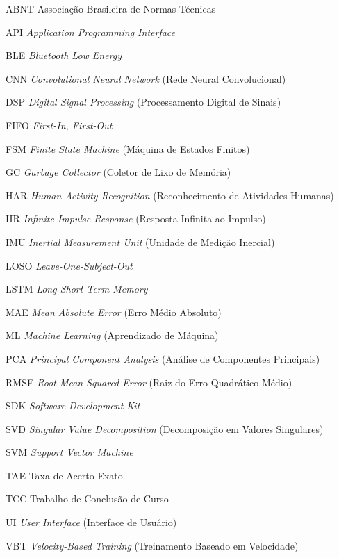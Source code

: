 \documentclass[12pt,openany,oneside,a4paper,english,brazil]{abntex2}
\begin{document}
\begin{siglas}
  \item[ABNT] Associação Brasileira de Normas Técnicas
  \item[API] \textit{Application Programming Interface}
  \item[BLE] \textit{Bluetooth Low Energy}
  \item[CNN] \textit{Convolutional Neural Network} (Rede Neural Convolucional)
  \item[DSP] \textit{Digital Signal Processing} (Processamento Digital de Sinais)
  \item[FIFO] \textit{First-In, First-Out}
  \item[FSM] \textit{Finite State Machine} (Máquina de Estados Finitos)
  \item[GC] \textit{Garbage Collector} (Coletor de Lixo de Memória)
  \item[HAR] \textit{Human Activity Recognition} (Reconhecimento de Atividades Humanas)
  \item[IIR] \textit{Infinite Impulse Response} (Resposta Infinita ao Impulso)
  \item[IMU] \textit{Inertial Measurement Unit} (Unidade de Medição Inercial)
  \item[LOSO] \textit{Leave-One-Subject-Out}
  \item[LSTM] \textit{Long Short-Term Memory}
  \item[MAE] \textit{Mean Absolute Error} (Erro Médio Absoluto)
  \item[ML] \textit{Machine Learning} (Aprendizado de Máquina)
  \item[PCA] \textit{Principal Component Analysis} (Análise de Componentes Principais)
  \item[RMSE] \textit{Root Mean Squared Error} (Raiz do Erro Quadrático Médio)
  \item[SDK] \textit{Software Development Kit}
  \item[SVD] \textit{Singular Value Decomposition} (Decomposição em Valores Singulares)
  \item[SVM] \textit{Support Vector Machine}
  \item[TAE] Taxa de Acerto Exato
  \item[TCC] Trabalho de Conclusão de Curso
  \item[UI] \textit{User Interface} (Interface de Usuário)
  \item[VBT] \textit{Velocity-Based Training} (Treinamento Baseado em Velocidade)
\end{siglas}
\end{document}
